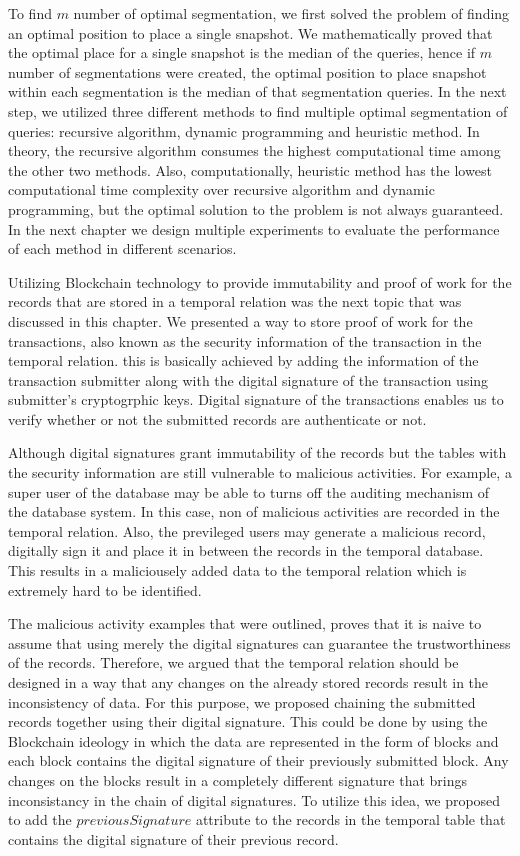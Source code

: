 		To find $m$ number of optimal segmentation, we first solved the problem of finding an optimal position to place a single snapshot. We mathematically proved that the optimal place for a single snapshot is the median of the queries, hence if $m$ number of segmentations were created, the optimal position to place snapshot within each segmentation is the median of that segmentation queries. In the next step, we utilized three different methods to find multiple optimal segmentation of queries: recursive algorithm, dynamic programming and heuristic method. In theory, the recursive algorithm consumes the highest computational time among the other two methods. Also, computationally, heuristic method has the lowest computational time complexity over recursive algorithm and dynamic programming, but the optimal solution to the problem is not always guaranteed. In the next chapter we design multiple experiments to evaluate the performance of each method in different scenarios.

		Utilizing Blockchain technology to provide immutability and proof of work for the records that are stored in a temporal relation was the next topic that was discussed in this chapter. We presented a way to store proof of work for the transactions, also known as the security information of the transaction in the temporal relation. this is basically achieved by adding the information of the transaction submitter along with the digital signature of the transaction using submitter's cryptogrphic keys. Digital signature of the transactions enables us to verify whether or not the submitted records are authenticate or not.

		Although digital signatures grant immutability of the records but the tables with the security information are still vulnerable to malicious activities. For example, a super user of the database may be able to turns off the auditing mechanism of the database system. In this case, non of malicious activities are recorded in the temporal relation. Also, the previleged users may generate a malicious record, digitally sign it and place it in between the records in the temporal database. This results in a maliciousely added data to the temporal relation which is extremely hard to be identified. 

		The malicious activity examples that were outlined, proves that it is naive to assume that using merely the digital signatures can guarantee the trustworthiness of the records. Therefore, we argued that the temporal relation should be designed in a way that any changes on the already stored records result in the inconsistency of data. For this purpose, we proposed chaining the submitted records together using their digital signature. This could be done by using the Blockchain ideology in which the data are represented in the form of blocks and each block contains the digital signature of their previously submitted block. Any changes on the blocks result in a completely different signature that brings inconsistancy in the chain of digital signatures. To utilize this idea, we proposed to add the $previousSignature$ attribute to the records in the temporal table that contains the digital signature of their previous record.

